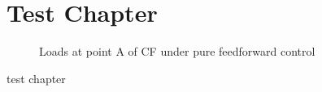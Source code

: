 \chapter{Test Chapter} 
\begin{figure}[h!]
    \centering
    \scalebox{0.8}{
    \begin{tikzpicture}
        
    \end{tikzpicture}}
    \caption{Loads at point A of CF under pure feedforward control}
    \label{fig:pureFeedFwdA}
\end{figure}

test chapter